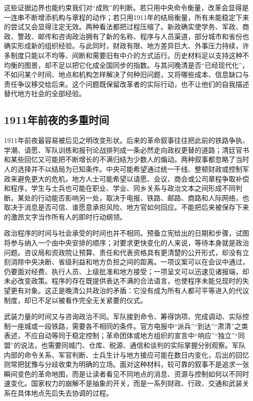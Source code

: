 这些证据边界也能约束我们对“成败”的判断。若只用中央命令衡量，改革会显得是一连串不断增添机构与章程的动作；若只用1911年的结局衡量，所有未能稳定下来的尝试又会显得注定无效。两种看法都把过程压缩了。新政确实使学务、军政、商政、警政、邮传和咨询政治拥有了新的名称、程序与人员渠道，部分城市和省份也确实形成新的组织经验。与此同时，财政有限、地方差异巨大、外事压力持续，许多制度只能以不均等、间断和需要旧有中介的方式运行。历史材料足以支持这种不均衡的图景，却不足以把它化成全国同步的指数。与其问晚清是否“已经现代化”，不如问某个时间、地点和机构怎样解决了何种旧问题，又将哪些成本、信息缺口与责任争议移交给后来。这个问题既保留改革者的实际行动，也不让他们的自我描述替代地方社会的全部经验。

\subsection{1911年前夜的多重时间}

1911年前夜最容易被后见之明改变形状。后来的革命叙事往往把此前的铁路争执、学潮、请愿、军队训练和报刊论战排列成一条必然走向政权更替的道路；清廷官书和某些回忆又可能把不断增长的不满归结为少数人的煽动。两种叙事都忽略了当时人的选择并不以结局为已知条件。中央可能希望通过统一干线、整顿财政或控制军政来避免更大的危机，地方人士可能希望以请愿、会议、商会或公司章程争取补偿和程序，学生与士兵也可能在职业、学业、同乡关系与政治文本之间形成不同判断。某处的行动能否影响另一处，取决于电报、铁路、邮路、商路和人际网络，也取决于消息是否可信、谁愿意承担风险、地方官如何回应。不能把后来被保存下来的激昂文字当作所有人的即时行动纲领。

政治程序的时间与社会承受的时间也并不相同。预备立宪给出的日期和步骤，试图将参与纳入一个由中央安排的顺序；对要求更快变化的人来说，等待本身就是政治问题。咨议局和资政院让预算、责任和代表资格具有更清楚的公开形式，却没有立刻消除中央决断、省级利益和地方负担之间的距离。一项议案可以在会议中通过，仍要面对经费、执行人员、上级批准和地方接受；一项呈文可以迅速见诸报端，却未必改变政策。程序的存在既提供表达不满的合法语言，也使程序未能兑现时的失望更有对象。这正是晚清公共政治的矛盾：它没有成为所有人都可平等进入的代议制度，却已不足以被看作完全无关紧要的仪式。

武装力量的时间又与咨询政治不同。军队接到命令、筹得饷项、完成调动、实际控制一座城或一段铁路，需要各不相同的条件。官方电报中“派兵”“到达”“肃清”之类表述，不应自动等同于稳定控制；革命团体或地方组织的宣言中“响应”“独立”“同盟”的说法，也需要同城门、仓库、税源、通信和谈判的实际掌握分别观察。军队内部的命令关系、军官判断、士兵生计与地方接应可能在数日内变化，后出的回忆则常把犹豫与分歧收束为明确的立场。面对这种材料，较可靠的叙事不是追求一张瞬间变色的革命地图，而是让读者看见不同地点的消息、资源与控制如何以不同时速变化。国家权力的崩解不是抽象的开关，而是一系列财政、行政、交通和武装关系在具体地点先后失去协调的过程。

